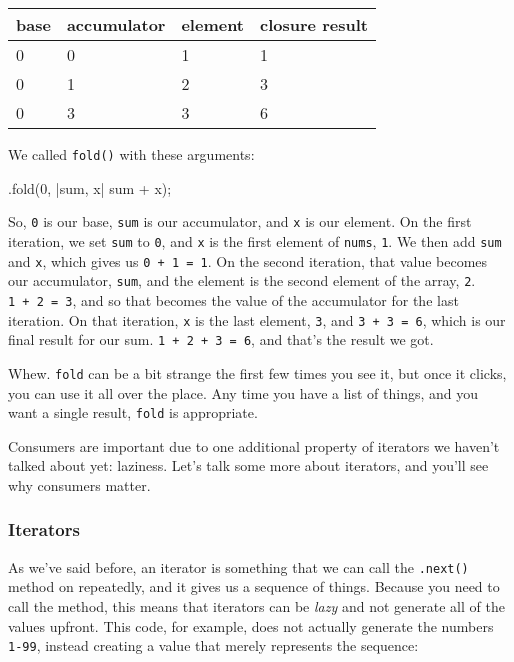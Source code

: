 \documentclass[a4paper,]{book}
\newenvironment{Shaded}{\begin{snugshade}}{\end{snugshade}}
\newcommand{\DecValTok}[1]{\textcolor[rgb]{0.00,0.00,0.81}{{#1}}}
\newcommand{\NormalTok}[1]{{#1}}
\begin{document}
\begin{longtable}[c]{@{}llll@{}}
\toprule
base & accumulator & element & closure result\tabularnewline
\midrule
\endhead
0 & 0 & 1 & 1\tabularnewline
0 & 1 & 2 & 3\tabularnewline
0 & 3 & 3 & 6\tabularnewline
\bottomrule
\end{longtable}

We called \texttt{fold()} with these arguments:

\begin{Shaded}
\begin{Highlighting}[]
\NormalTok{.fold(}\DecValTok{0}\NormalTok{, |sum, x| sum + x);}
\end{Highlighting}
\end{Shaded}

So, \texttt{0} is our base, \texttt{sum} is our accumulator, and
\texttt{x} is our element. On the first iteration, we set \texttt{sum}
to \texttt{0}, and \texttt{x} is the first element of \texttt{nums},
\texttt{1}. We then add \texttt{sum} and \texttt{x}, which gives us
\texttt{0\ +\ 1\ =\ 1}. On the second iteration, that value becomes our
accumulator, \texttt{sum}, and the element is the second element of the
array, \texttt{2}. \texttt{1\ +\ 2\ =\ 3}, and so that becomes the value
of the accumulator for the last iteration. On that iteration, \texttt{x}
is the last element, \texttt{3}, and \texttt{3\ +\ 3\ =\ 6}, which is
our final result for our sum. \texttt{1\ +\ 2\ +\ 3\ =\ 6}, and that's
the result we got.

Whew. \texttt{fold} can be a bit strange the first few times you see it,
but once it clicks, you can use it all over the place. Any time you have
a list of things, and you want a single result, \texttt{fold} is
appropriate.

Consumers are important due to one additional property of iterators we
haven't talked about yet: laziness. Let's talk some more about
iterators, and you'll see why consumers matter.

\subsubsection{Iterators}\label{iterators}

As we've said before, an iterator is something that we can call the
\texttt{.next()} method on repeatedly, and it gives us a sequence of
things. Because you need to call the method, this means that iterators
can be \emph{lazy} and not generate all of the values upfront. This
code, for example, does not actually generate the numbers \texttt{1-99},
instead creating a value that merely represents the sequence:
\end{document}
